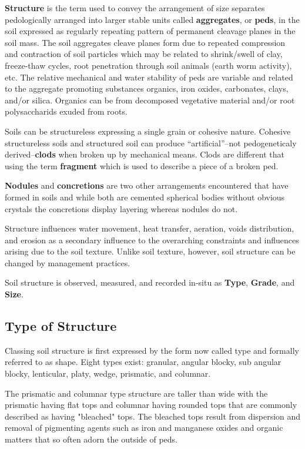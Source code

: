 \documentclass{book}
\begin{document}
\textbf{Structure} is the term used to convey the arrangement of size separates pedologically arranged into larger stable units called \textbf{aggregates}, or \textbf{peds}, in the soil expressed as regularly repeating pattern of permanent cleavage planes in the soil mass. The soil aggregates cleave planes form due to repeated compression and contraction of soil particles which may be related to shrink/swell of clay, freeze-thaw cycles, root penetration through soil animals (earth worm activity), etc. The relative mechanical and water stability of peds are variable and related to the aggregate promoting substances organics, iron oxides, carbonates, clays, and/or silica. Organics can be from decomposed vegetative material and/or root polysaccharids exuded from roots.
    
Soils can be structureless expressing a single grain or cohesive nature. Cohesive structureless soils and structured soil can produce “artificial”–not pedogeneticaly derived–\textbf{clods} when broken up by mechanical means. Clods are different that using the term \textbf{fragment} which is used to describe a piece of a broken ped.
    
\textbf{Nodules} and \textbf{concretions} are two other arrangements encountered that have formed in soils and while both are cemented spherical bodies without obvious crystals the concretions display layering whereas nodules do not.
    
Structure influences water movement, heat transfer, aeration, voids distribution, and erosion as a secondary influence to the overarching constraints and influences arising due to the soil texture. Unlike soil texture, however, soil structure can be changed by management practices.
    
Soil structure is observed, measured, and recorded in-situ as \textbf{Type}, \textbf{Grade}, and \textbf{Size}.
    
\subsection{Type of Structure}
    
Classing soil structure is first expressed by the form now called type and formally referred to as shape. Eight types exist: granular, angular blocky, sub angular blocky, lenticular, platy, wedge, prismatic, and columnar.

The prismatic and columnar type structure are taller than wide with the prismatic having flat tops and columnar having rounded tops that are commonly described as having "bleached" tops. The bleached tops result from dispersion and removal of pigmenting agents such as iron and manganese oxides and organic matters that so often adorn the outside of peds.
\end{document}

